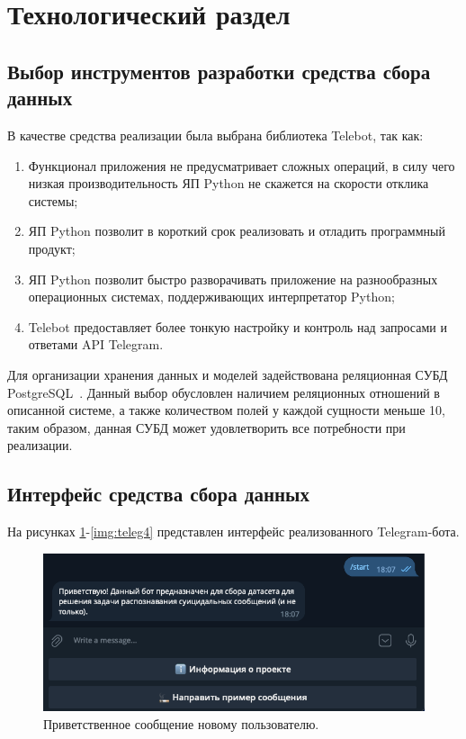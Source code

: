 \section{Технологический раздел}

\subsection{Выбор инструментов разработки средства сбора данных}

В качестве средства реализации была выбрана библиотека Telebot, так как:

\begin{enumerate}
	\item[1.] Функционал приложения не предусматривает сложных операций, в силу чего низкая производительность ЯП Python не скажется на скорости отклика системы;
	\item[2.] ЯП Python позволит в короткий срок реализовать и отладить программный продукт;
	\item[3.] ЯП Python позволит быстро разворачивать приложение на разнообразных операционных системах, поддерживающих интерпретатор Python;
	\item[4.] Telebot предоставляет более тонкую настройку и контроль над запросами и ответами API Telegram.
\end{enumerate}

Для организации хранения данных и моделей задействована реляционная СУБД PostgreSQL~\cite{postgres}. Данный выбор обусловлен наличием реляционных отношений в описанной системе, а также количеством полей у каждой сущности меньше 10, таким образом, данная СУБД может удовлетворить все потребности при реализации.

\subsection{Интерфейс средства сбора данных}

На рисунках \ref{img:teleg1}-\ref{img:teleg4} представлен интерфейс реализованного Telegram-бота.

\begin{figure}[H]
	\centering
	\includegraphics[width=\textwidth]{inc/teleg1.png}
	\caption{ Приветственное сообщение новому пользователю. }
	\label{img:teleg1}
\end{figure}

